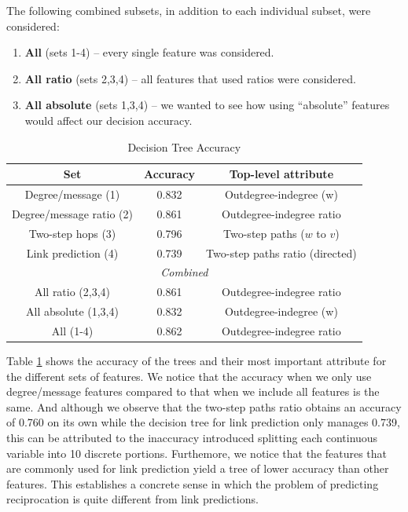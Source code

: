 \documentclass[conference]{IEEEtran}
\begin{document}
The following combined subsets, in addition to each individual subset, were considered:
\begin{enumerate}
	\item {\bf All} (sets 1-4) -- every single feature was considered.
	\item {\bf All ratio} (sets 2,3,4) -- all features that used ratios were considered.
	\item {\bf All absolute} (sets 1,3,4) -- we wanted to see how using ``absolute'' features would affect our decision accuracy.
\end{enumerate}
\begin{table}[!t]
\renewcommand{\arraystretch}{1.3}
\caption{Decision Tree Accuracy}
\label{table_recresults_dtree}
\centering
\begin{tabular}{|c||c|c|}
\hline
\bf{Set} & Accuracy & Top-level attribute \\
\hline
Degree/message (1) & 0.832 & Outdegree-indegree (w) \\
Degree/message ratio (2) & 0.861 & Outdegree-indegree ratio \\
Two-step hops (3) & 0.796 & Two-step paths ($w$ to $v$) \\
Link prediction (4) & 0.739 & Two-step paths ratio (directed) \\
\hline
\multicolumn{3}{|c|}{\emph{Combined}} \\
\hline
All ratio (2,3,4) & 0.861 & Outdegree-indegree ratio \\
All absolute (1,3,4) & 0.832 & Outdegree-indegree (w) \\
All (1-4) & 0.862 & Outdegree-indegree ratio \\
\hline
\end{tabular}
\end{table}

Table \ref{table_recresults_dtree} shows the accuracy of the trees and
their most important attribute for the different sets of features. We
notice that the accuracy when we only use degree/message features
compared to that when we include all features is the same. And
although we observe that the two-step paths ratio obtains an accuracy
of 0.760 on its own while the decision tree for link prediction only
manages 0.739, this can be attributed to the inaccuracy introduced
splitting each continuous variable into 10 discrete portions.
Furthemore, we notice that the features that are commonly used for
link prediction yield a tree of lower accuracy than other features.
This establishes a concrete sense in which 
the problem of predicting reciprocation is quite different
from link predictions.
\end{document}
